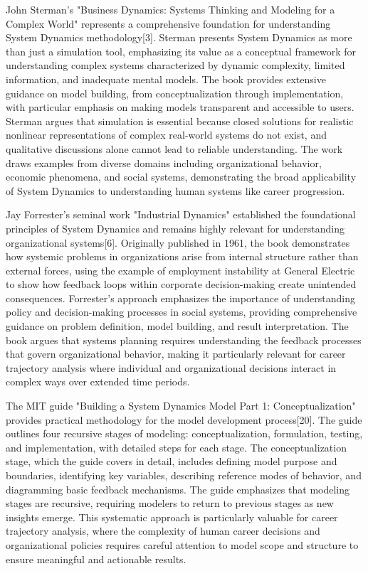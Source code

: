 \documentclass[main.tex]{subfiles}
\begin{document}
John Sterman's "Business Dynamics: Systems Thinking and Modeling for a Complex World" represents a comprehensive foundation for understanding System Dynamics methodology[3]. Sterman presents System Dynamics as more than just a simulation tool, emphasizing its value as a conceptual framework for understanding complex systems characterized by dynamic complexity, limited information, and inadequate mental models. The book provides extensive guidance on model building, from conceptualization through implementation, with particular emphasis on making models transparent and accessible to users. Sterman argues that simulation is essential because closed solutions for realistic nonlinear representations of complex real-world systems do not exist, and qualitative discussions alone cannot lead to reliable understanding. The work draws examples from diverse domains including organizational behavior, economic phenomena, and social systems, demonstrating the broad applicability of System Dynamics to understanding human systems like career progression.


Jay Forrester's seminal work "Industrial Dynamics" established the foundational principles of System Dynamics and remains highly relevant for understanding organizational systems[6]. Originally published in 1961, the book demonstrates how systemic problems in organizations arise from internal structure rather than external forces, using the example of employment instability at General Electric to show how feedback loops within corporate decision-making create unintended consequences. Forrester's approach emphasizes the importance of understanding policy and decision-making processes in social systems, providing comprehensive guidance on problem definition, model building, and result interpretation. The book argues that systems planning requires understanding the feedback processes that govern organizational behavior, making it particularly relevant for career trajectory analysis where individual and organizational decisions interact in complex ways over extended time periods.


The MIT guide "Building a System Dynamics Model Part 1: Conceptualization" provides practical methodology for the model development process[20]. The guide outlines four recursive stages of modeling: conceptualization, formulation, testing, and implementation, with detailed steps for each stage. The conceptualization stage, which the guide covers in detail, includes defining model purpose and boundaries, identifying key variables, describing reference modes of behavior, and diagramming basic feedback mechanisms. The guide emphasizes that modeling stages are recursive, requiring modelers to return to previous stages as new insights emerge. This systematic approach is particularly valuable for career trajectory analysis, where the complexity of human career decisions and organizational policies requires careful attention to model scope and structure to ensure meaningful and actionable results.
\end{document}
